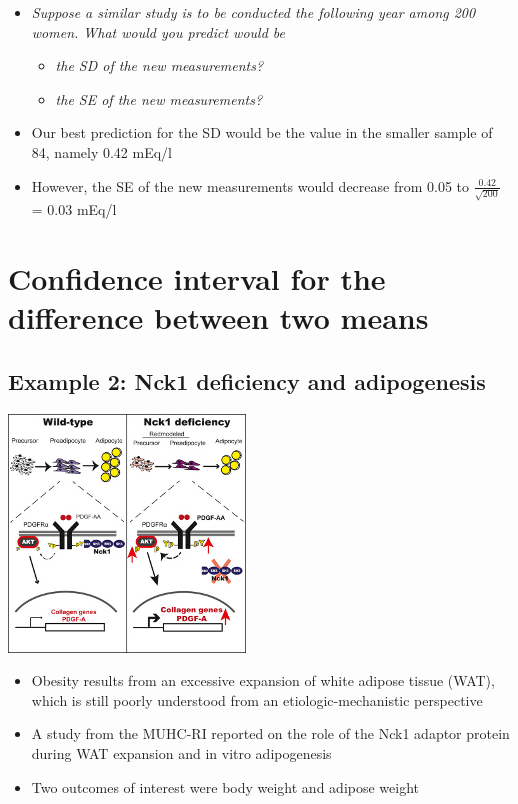 \documentclass[
]{book}
\providecommand{\tightlist}{%
  \setlength{\itemsep}{0pt}\setlength{\parskip}{0pt}}
\begin{document}
\begin{itemize}
\tightlist
\item
  \emph{Suppose a similar study is to be conducted the following year among 200 women. What would you predict would be}

  \begin{itemize}
  \tightlist
  \item
    \emph{the SD of the new measurements?}
  \item
    \emph{the SE of the new measurements?}
  \end{itemize}
\item
  Our best prediction for the SD would be the value in the smaller sample of 84, namely 0.42 mEq/l
\item
  However, the SE of the new measurements would decrease from 0.05 to \(\frac{0.42}{\sqrt {200}}\) = 0.03 mEq/l
\end{itemize}

\hypertarget{confidence-interval-for-the-difference-between-two-means}{%
\section{Confidence interval for the difference between two means}\label{confidence-interval-for-the-difference-between-two-means}}

\hypertarget{example-2-nck1-deficiency-and-adipogenesis}{%
\subsection{Example 2: Nck1 deficiency and adipogenesis}\label{example-2-nck1-deficiency-and-adipogenesis}}

\includegraphics[width=0.5\linewidth]{./3_53}

\begin{itemize}
\tightlist
\item
  Obesity results from an excessive expansion of white adipose tissue (WAT), which is still poorly understood from an etiologic-mechanistic perspective
\item
  A study from the MUHC-RI reported on the role of the Nck1 adaptor protein during WAT expansion and in vitro adipogenesis
\item
  Two outcomes of interest were body weight and adipose weight
\end{itemize}
\end{document}
